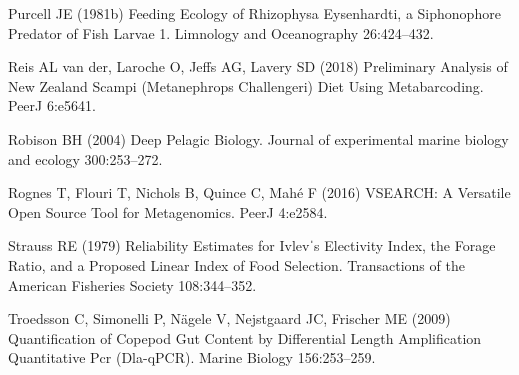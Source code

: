 \documentclass[12pt,]{article}
\begin{document}
\leavevmode\hypertarget{ref-purcell1981feeding}{}%
Purcell JE (1981b) Feeding Ecology of Rhizophysa Eysenhardti, a Siphonophore Predator of Fish Larvae 1. Limnology and Oceanography 26:424--432.

\leavevmode\hypertarget{ref-van2018preliminary}{}%
Reis AL van der, Laroche O, Jeffs AG, Lavery SD (2018) Preliminary Analysis of New Zealand Scampi (Metanephrops Challengeri) Diet Using Metabarcoding. PeerJ 6:e5641.

\leavevmode\hypertarget{ref-robison2004deep}{}%
Robison BH (2004) Deep Pelagic Biology. Journal of experimental marine biology and ecology 300:253--272.

\leavevmode\hypertarget{ref-rognes2016vsearch}{}%
Rognes T, Flouri T, Nichols B, Quince C, Mahé F (2016) VSEARCH: A Versatile Open Source Tool for Metagenomics. PeerJ 4:e2584.

\leavevmode\hypertarget{ref-strauss1979reliability}{}%
Strauss RE (1979) Reliability Estimates for Ivlevˈs Electivity Index, the Forage Ratio, and a Proposed Linear Index of Food Selection. Transactions of the American Fisheries Society 108:344--352.

\leavevmode\hypertarget{ref-troedsson2009quantification}{}%
Troedsson C, Simonelli P, Nägele V, Nejstgaard JC, Frischer ME (2009) Quantification of Copepod Gut Content by Differential Length Amplification Quantitative Pcr (Dla-qPCR). Marine Biology 156:253--259.
\end{document}
